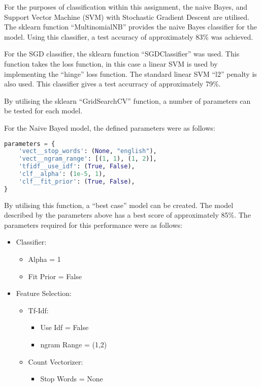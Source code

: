 For the purposes of classification within this assignment, the naive Bayes, and
Support Vector Machine (SVM) with Stochastic Gradient Descent are utilised. The
sklearn function ``MultinomialNB'' provides the naive Bayes classifier for the
model\cite{skBayes}. Using this classifier, a test accuracy of approximately
83\% was achieved.

\par For the SGD classifier, the sklearn function ``SGDClassifier'' was used.
This function takes the loss function, in this case a linear SVM is used by
implementing the ``hinge'' loss function. The standard linear SVM ``l2'' penalty
is also used. This classifier gives a test accurracy of approximately 79\%.

By utilising the sklearn ``GridSearchCV'' function, a number of parameters can
be tested for each model.

For the Naive Bayed model, the defined parameters were as follows:

\begin{lstlisting}[language=Python, caption={Bayes Model Parameters},
label={lst:bayesParam}]
parameters = {
    'vect__stop_words': (None, "english"),
    'vect__ngram_range': [(1, 1), (1, 2)],
    'tfidf__use_idf': (True, False),
    'clf__alpha': (1e-5, 1),
    'clf__fit_prior': (True, False),
}
\end{lstlisting}

By utilising this function, a ``best case'' model can be created. The model
described by the parameters above has a best score of approximately 85\%. The
parameters required for this performance were as follows:

\begin{itemize}
	\item Classifier:
	\begin{itemize}
		\item Alpha = 1
		\item Fit Prior = False
	\end{itemize}
	\item Feature Selection:
	\begin{itemize}
		\item Tf-Idf:
		\begin{itemize}
			\item Use Idf = False
			\item ngram Range = (1,2)
		\end{itemize}
		\item Count Vectorizer:
		\begin{itemize}
			\item Stop Words = None
		\end{itemize}
	\end{itemize}
\end{itemize}

